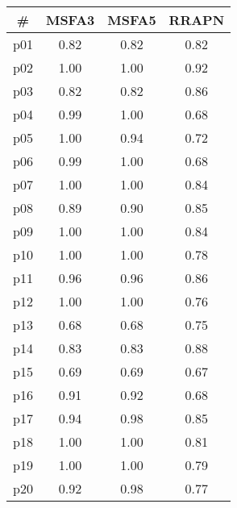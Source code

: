 \begin{tabular}{cccc}
\toprule
\textbf{\#} & \textbf{MSFA3} & \textbf{MSFA5} & \textbf{RRAPN}\\
\midrule
p01 & 0.82 & 0.82 & 0.82\\
p02 & 1.00 & 1.00 & 0.92\\
p03 & 0.82 & 0.82 & 0.86\\
p04 & 0.99 & 1.00 & 0.68\\
p05 & 1.00 & 0.94 & 0.72\\
p06 & 0.99 & 1.00 & 0.68\\
p07 & 1.00 & 1.00 & 0.84\\
p08 & 0.89 & 0.90 & 0.85\\
p09 & 1.00 & 1.00 & 0.84\\
p10 & 1.00 & 1.00 & 0.78\\
p11 & 0.96 & 0.96 & 0.86\\
p12 & 1.00 & 1.00 & 0.76\\
p13 & 0.68 & 0.68 & 0.75\\
p14 & 0.83 & 0.83 & 0.88\\
p15 & 0.69 & 0.69 & 0.67\\
p16 & 0.91 & 0.92 & 0.68\\
p17 & 0.94 & 0.98 & 0.85\\
p18 & 1.00 & 1.00 & 0.81\\
p19 & 1.00 & 1.00 & 0.79\\
p20 & 0.92 & 0.98 & 0.77\\
\bottomrule
\end{tabular}

